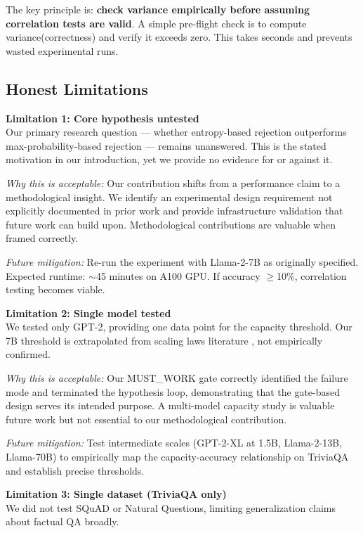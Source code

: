 The key principle is: \textbf{check variance empirically before assuming correlation tests are valid}. A simple pre-flight check is to compute variance(correctness) and verify it exceeds zero. This takes seconds and prevents wasted experimental runs.

\subsection{Honest Limitations}

\textbf{Limitation 1: Core hypothesis untested}\\
Our primary research question --- whether entropy-based rejection outperforms max-probability-based rejection --- remains unanswered. This is the stated motivation in our introduction, yet we provide no evidence for or against it.

\textit{Why this is acceptable:} Our contribution shifts from a performance claim to a methodological insight. We identify an experimental design requirement not explicitly documented in prior work and provide infrastructure validation that future work can build upon. Methodological contributions are valuable when framed correctly.

\textit{Future mitigation:} Re-run the experiment with Llama-2-7B as originally specified. Expected runtime: $\sim$45 minutes on A100 GPU. If accuracy $\geq$10\%, correlation testing becomes viable.

\textbf{Limitation 2: Single model tested}\\
We tested only GPT-2, providing one data point for the capacity threshold. Our 7B threshold is extrapolated from scaling laws literature \citep{Roberts2020}, not empirically confirmed.

\textit{Why this is acceptable:} Our MUST\_WORK gate correctly identified the failure mode and terminated the hypothesis loop, demonstrating that the gate-based design serves its intended purpose. A multi-model capacity study is valuable future work but not essential to our methodological contribution.

\textit{Future mitigation:} Test intermediate scales (GPT-2-XL at 1.5B, Llama-2-13B, Llama-70B) to empirically map the capacity-accuracy relationship on TriviaQA and establish precise thresholds.

\textbf{Limitation 3: Single dataset (TriviaQA only)}\\
We did not test SQuAD or Natural Questions, limiting generalization claims about factual QA broadly.


